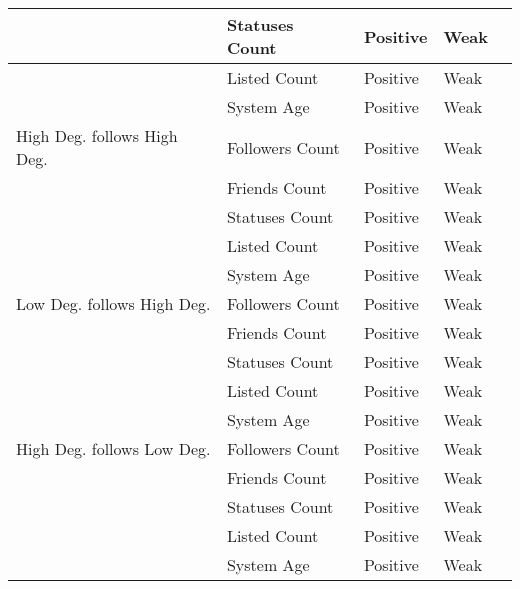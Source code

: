 \begin{tabular}[t]{| p{1.5in} | p{1.25in} | p{1in} | p{1in} | p{1.25in} |}
                     & Statuses Count & Positive & Weak &  \\ \hline
                     & Listed Count & Positive & Weak &  \\ \hline
                     & System Age & Positive & Weak &  \\ \hline
High Deg. follows High Deg. & Followers Count & Positive & Weak &  \\ \hline
                     & Friends Count & Positive & Weak &  \\ \hline
                     & Statuses Count & Positive & Weak &  \\ \hline
                     & Listed Count & Positive & Weak &  \\ \hline
                     & System Age & Positive & Weak &  \\ \hline
Low Deg. follows High Deg. & Followers Count & Positive & Weak &  \\ \hline
                     & Friends Count & Positive & Weak &  \\ \hline
                     & Statuses Count & Positive & Weak &  \\ \hline
                     & Listed Count & Positive & Weak &  \\ \hline
                     & System Age & Positive & Weak &  \\ \hline
High Deg. follows Low Deg. & Followers Count & Positive & Weak &  \\ \hline
                     & Friends Count & Positive & Weak &  \\ \hline
                     & Statuses Count & Positive & Weak &  \\ \hline
                     & Listed Count & Positive & Weak &  \\ \hline
                     & System Age & Positive & Weak &  \\ \hline
\end{tabular}